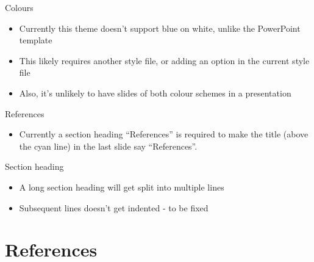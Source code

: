 \documentclass[aspectratio=169]{beamer}
\begin{document}
\begin{frame}{Colours}
  \begin{itemize}
  \item Currently this theme doesn't support blue on white, unlike the PowerPoint template
  \item This likely requires another style file, or adding an option in the current style file
  \item Also, it's unlikely to have slides of both colour schemes in a presentation
  \end{itemize}

\end{frame}

\begin{frame}{References}

  \begin{itemize}
  \item Currently a section heading ``References'' is required to make the title (above the cyan line) in the last slide say ``References''.
  \end{itemize}

\end{frame}

\begin{frame}{Section heading}

  \begin{itemize}
  \item A long section heading will get split into multiple lines
  \item Subsequent lines doesn't get indented - to be fixed
  \end{itemize}

\end{frame}

\section{References}



\end{document}
